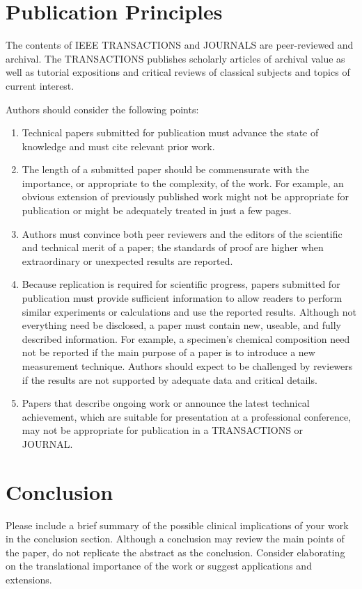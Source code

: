 \documentclass[transmag]{IEEEtran}
\begin{document}
\section{Publication Principles}
The contents of IEEE TRANSACTIONS and JOURNALS are peer-reviewed and 
archival. The TRANSACTIONS publishes scholarly articles of archival value as 
well as tutorial expositions and critical reviews of classical subjects and 
topics of current interest. 

Authors should consider the following points:

\begin{enumerate}
\item Technical papers submitted for publication must advance the state of knowledge and must cite relevant prior work. 
\item The length of a submitted paper should be commensurate with the importance, or appropriate to the complexity, of the work. For example, an obvious extension of previously published work might not be appropriate for publication or might be adequately treated in just a few pages.
\item Authors must convince both peer reviewers and the editors of the scientific and technical merit of a paper; the standards of proof are higher when extraordinary or unexpected results are reported. 
\item Because replication is required for scientific progress, papers submitted for publication must provide sufficient information to allow readers to perform similar experiments or calculations and use the reported results. Although not everything need be disclosed, a paper must contain new, useable, and fully described information. For example, a specimen's chemical composition need not be reported if the main purpose of a paper is to introduce a new measurement technique. Authors should expect to be challenged by reviewers if the results are not supported by adequate data and critical details.
\item Papers that describe ongoing work or announce the latest technical achievement, which are suitable for presentation at a professional conference, may not be appropriate for publication in a TRANSACTIONS or JOURNAL.
\end{enumerate}

\section{Conclusion}
Please include a brief summary of the possible clinical implications of your 
work in the conclusion section. Although a conclusion may review the main 
points of the paper, do not replicate the abstract as the conclusion. 
Consider elaborating on the translational importance of the work or suggest 
applications and extensions. 
\end{document}
